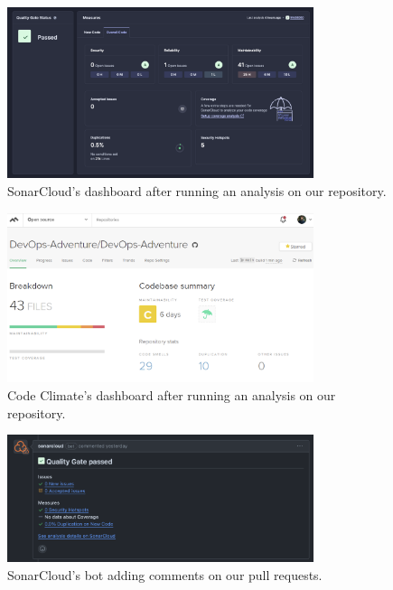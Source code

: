 \documentclass{article}
\begin{document}
\begin{figure}[ht]
    \centering
    \includegraphics[width=0.8\textwidth]{./images/SonarCloud_Analysis.png}
    \caption{SonarCloud's dashboard after running an analysis on our repository.}
    \label{fig:sc_dashboard}
\end{figure}
\begin{figure}[ht]
    \centering
    \includegraphics[width=0.8\textwidth]{./images/CodeClimate_analysis.png}
    \caption{Code Climate's dashboard after running an analysis on our repository.}
    \label{fig:cc_dashboard}
\end{figure}
\begin{figure}[ht]
    \centering
    \includegraphics[width=0.8\textwidth]{./images/SonarCloud_bot.png}
    \caption{SonarCloud's bot adding comments on our pull requests.}
    \label{fig:sc_bot_dashboard}
\end{figure}
\end{document}

